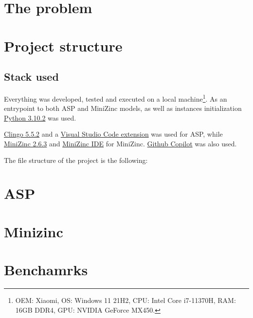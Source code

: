\section{The problem}

\section{Project structure}

\subsection{Stack used}

Everything was developed, tested and executed on a local machine\footnote{OEM: Xiaomi, OS: Windows 11 21H2, CPU: Intel Core i7-11370H, RAM: 16GB DDR4, GPU: NVIDIA GeForce MX450.}. As an entrypoint to both ASP and MiniZinc models, as well as instances initialization \href{https://www.python.org/downloads/release/python-3102/}{Python 3.10.2} was used.

\href{https://github.com/potassco/clingo/releases/tag/v5.5.2}{Clingo 5.5.2} and a \href{https://marketplace.visualstudio.com/items?itemName=abelcour.asp-syntax-highlight}{Visual Studio Code extension} was used for ASP, while \href{https://github.com/MiniZinc/libminizinc/releases/tag/2.6.3}{MiniZinc 2.6.3} and \href{https://www.minizinc.org/ide/}{MiniZinc IDE} for MiniZinc. \href{https://copilot.github.com/}{Github Copilot} was also used.

The file structure of the project is the following:

\section{ASP}

\section{Minizinc}

\section{Benchamrks}
